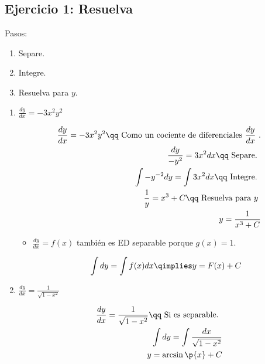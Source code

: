 \subsection{Ejercicio 1: Resuelva}
Pasos:
\begin{enumerate}
    \item Separe.
    \item Integre.
    \item Resuelva para $y$.
\end{enumerate}
\begin{enumerate}
    \item $\displaystyle \frac{d y}{d x} = -3x^2y^2$ 
        \begin{center}
           \begin{align*}
                \frac{d y}{d x} = -3x^2y^2 \qq \text{ Como un cociente de diferenciales $\frac{d y}{d x} $ }. \\ 
                \frac{d y}{-y^2} = 3x^2dx \qq \text{ Separe. } \\ 
                \int -y^{-2}dy = \int 3x^2dx \qq \text{ Integre. } \\ 
                \frac{1}{y}=x^3+C \qq \text{ Resuelva para $y$ } \\ 
                y = \frac{1}{x^3+C} \\ 
           \end{align*}
        \end{center}
        \begin{itemize}
            \item $\displaystyle \frac{d y}{d x} =f(x)$ también es ED separable porque $g(x)=1$.
                \begin{center}
                    \begin{align*}
                        \int dy = \int f(x) dx \qimplies y = F(x) + C \\ 
                    \end{align*}
                \end{center}
        \end{itemize}
    
    \item $\displaystyle \frac{d y}{d x} =\frac{1}{\sqrt{1-x^2}}$ 
        \begin{center}
           \begin{align*}
                \frac{d y}{d x} =\frac{1}{\sqrt{1-x^2}} \qq \text{ Si es separable. } \\ 
                \int dy = \int \frac{dx}{\sqrt{1-x^2}} \\ 
                y = \arcsin\p{ x } + C \\ 
           \end{align*}
        \end{center}
\end{enumerate}

